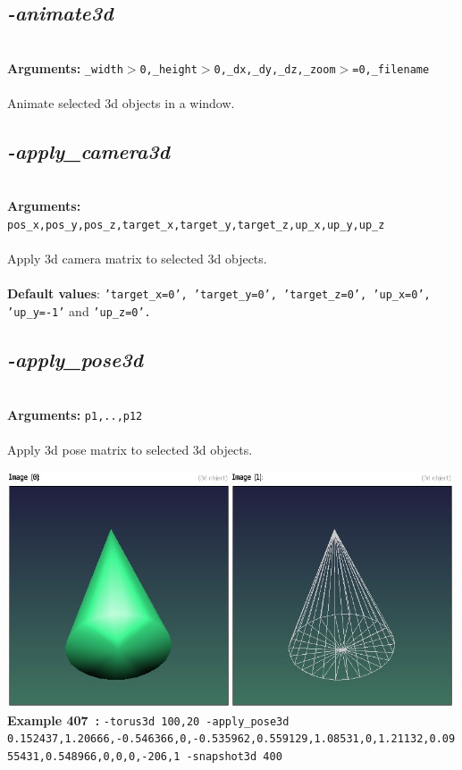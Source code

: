 \documentclass[a4paper,11pt,twoside]{book}
\begin{document}
\subsection{\emph{-animate3d} }\vspace*{-0.5em}
~\\\textbf{Arguments: } 
{\small \texttt{\_width$>$0,\_height$>$0,\_dx,\_dy,\_dz,\_zoom$>$=0,\_filename}}\\~\\
Animate selected 3d objects in a window.


\subsection{\emph{-apply\_camera3d} }\vspace*{-0.5em}
~\\\textbf{Arguments: } 
{\small \texttt{pos\_x,pos\_y,pos\_z,target\_x,target\_y,target\_z,up\_x,up\_y,up\_z}}\\~\\
Apply 3d camera matrix to selected 3d objects.
~\\~\\\textbf{Default values}: {\small \texttt{'target\_x=0', 'target\_y=0', 'target\_z=0', 'up\_x=0', 'up\_y=-1'} and \texttt{'up\_z=0'.}}


\subsection{\emph{-apply\_pose3d} }\vspace*{-0.5em}
~\\\textbf{Arguments: } 
{\small \texttt{p1,..,p12}}\\~\\
Apply 3d pose matrix to selected 3d objects.
\begin{center}\includegraphics[keepaspectratio=true,height=7cm,width=\textwidth]{img/gmic_def407.jpg}\\
{\footnotesize \textbf{Example 407~:} \texttt{-torus3d 100,20 -apply\_pose3d 0.152437,1.20666,-0.546366,0,-0.535962,0.559129,1.08531,0,1.21132,0.0955431,0.548966,0,0,0,-206,1 -snapshot3d 400}}
\end{center}
\end{document}
